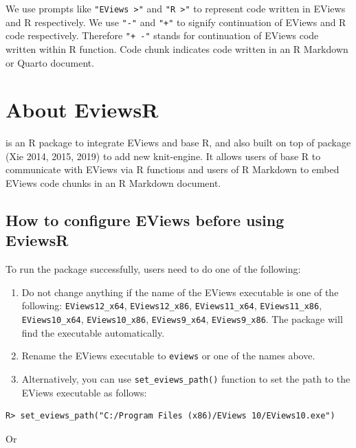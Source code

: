 We use prompts like \texttt{"EViews\ \textgreater{}"} and \texttt{"R\ \textgreater{}"} to represent code written in EViews and R respectively. We use \texttt{"-"} and \texttt{"+"} to signify continuation of EViews and R code respectively. Therefore \texttt{"+\ -"} stands for continuation of EViews code written within R function. Code chunk indicates code written in an R Markdown or Quarto document.

\hypertarget{sec-eviewsr}{%
\section{About EviewsR}\label{sec-eviewsr}}

 is an R package to integrate EViews and base R, and also built on top of  package (Xie 2014, 2015, 2019) to add new knit-engine. It allows users of base R to communicate with EViews via R functions and users of R Markdown to embed EViews code chunks in an R Markdown document.

\hypertarget{sec-configuration}{%
\subsection{How to configure EViews before using EviewsR}\label{sec-configuration}}

To run the package successfully, users need to do one of the following:

\begin{enumerate}
\def\labelenumi{\arabic{enumi}.}
\item
  Do not change anything if the name of the EViews executable is one of the following: \texttt{EViews12\_x64}, \texttt{EViews12\_x86}, \texttt{EViews11\_x64}, \texttt{EViews11\_x86}, \texttt{EViews10\_x64}, \texttt{EViews10\_x86}, \texttt{EViews9\_x64}, \texttt{EViews9\_x86}. The package will find the executable automatically.
\item
  Rename the EViews executable to \texttt{eviews} or one of the names above.
\item
  Alternatively, you can use \texttt{set\_eviews\_path()} function to set the path to the EViews executable as follows:
\end{enumerate}

\begin{verbatim}
R> set_eviews_path("C:/Program Files (x86)/EViews 10/EViews10.exe")
\end{verbatim}

Or

